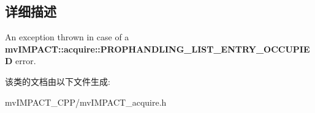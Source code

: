 \subsection{详细描述}
An exception thrown in case of a {\bfseries mv\+I\+M\+P\+A\+C\+T\+::acquire\+::\+P\+R\+O\+P\+H\+A\+N\+D\+L\+I\+N\+G\+\_\+\+L\+I\+S\+T\+\_\+\+E\+N\+T\+R\+Y\+\_\+\+O\+C\+C\+U\+P\+I\+E\+D} error. 

该类的文档由以下文件生成\+:\begin{DoxyCompactItemize}
\item 
mv\+I\+M\+P\+A\+C\+T\+\_\+\+C\+P\+P/mv\+I\+M\+P\+A\+C\+T\+\_\+acquire.\+h\end{DoxyCompactItemize}
